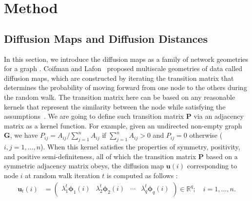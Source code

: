 \documentclass[11pt]{article}
\theoremstyle{definition}
\begin{document}
	\section{Method}
	\label{sec:method}
	\subsection{Diffusion Maps and Diffusion Distances}
	\label{ssec:method2}
	
	In this section, we introduce the diffusion maps as a family of network geometries for a graph \cite{coifman2006diffusion}. Coifman and Lafon~\cite{coifman2006diffusion,lafon2006diffusion} proposed multiscale geometries of data called diffusion maps, which are constructed by iterating the transition matrix that determines the probability of moving forward from one node to the others during the random walk. The transition matrix here can be based on any reasonable kernels that represent the similarity between the node while satisfying the assumptions~\cite{coifman2006diffusion, coifman2005geometric}. We are going to define such transition matrix $\mathbf{P}$ via an adjacency matrix as a kernel function. For example, given an undirected non-empty graph $\mathbf{G}$, we have $P_{ij} = A_{ij} / \sum\limits_{j=1}^{n} A_{ij}$ if $\sum\limits_{j=1}^{n} A_{ij} > 0$ and $P_{ij} = 0$ otherwise ($i,j=1,\ldots,n$). When this kernel satisfies the properties of symmetry, positivity, and positive semi-definiteness, all of which the transition matrix $\mathbf{P}$ based on a symmetric adjacency matrix obeys, the diffusion map $\mathbf{u}(i)$ corresponding to node $i$ at random walk iteration $t$ is computed as follows : 
	\begin{align}
	\label{eq:U}
	\mathbf{u}_{t}(i)  &= \begin{pmatrix} \lambda^{t}_{1} \mathbf{\phi}_{1}(i) & \lambda^{t}_{2} \mathbf{\phi}_{2} (i)  & \cdots & \lambda^{t}_{q} \mathbf{\phi}_{q}(i) \end{pmatrix} \in \mathbb{R}^{q}; \quad i = 1, \ldots, n.
	\end{align}
\end{document}
